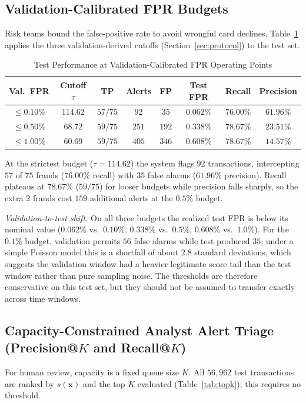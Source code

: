 \documentclass[conference]{IEEEtran}
\begin{document}
\subsection{Validation-Calibrated FPR Budgets}
Risk teams bound the false-positive rate to avoid wrongful card declines. Table~\ref{tab:fpr_budgets} applies the three validation-derived cutoffs (Section~\ref{sec:protocol}) to the test set.

\begin{table}[!t]
\centering
\caption{Test Performance at Validation-Calibrated FPR Operating Points}
\renewcommand{\arraystretch}{1.15}
\small
\begin{tabular}{cccccccc}
\toprule
\textbf{Val.\ FPR} & \textbf{Cutoff $\tau$} & \textbf{TP} & \textbf{Alerts} & \textbf{FP} & \textbf{Test FPR} & \textbf{Recall} & \textbf{Precision} \\
\midrule
$\mathbf{\le 0.10\%}$ & $114.62$ & $57/75$ & $92$ & $35$ & $0.062\%$ & $\mathbf{76.00\%}$ & $\mathbf{61.96\%}$ \\
$\le 0.50\%$ & $68.72$ & $59/75$ & $251$ & $192$ & $0.338\%$ & $78.67\%$ & $23.51\%$ \\
$\le 1.00\%$ & $60.69$ & $59/75$ & $405$ & $346$ & $0.608\%$ & $78.67\%$ & $14.57\%$ \\
\bottomrule
\end{tabular}
\label{tab:fpr_budgets}
\end{table}

At the strictest budget ($\tau = 114.62$) the system flags $92$ transactions, intercepting $57$ of $75$ frauds ($76.00\%$ recall) with $35$ false alarms ($61.96\%$ precision). Recall plateaus at $78.67\%$ ($59/75$) for looser budgets while precision falls sharply, so the extra $2$ frauds cost $159$ additional alerts at the $0.5\%$ budget.

\textit{Validation-to-test shift.} On all three budgets the realized test FPR is below its nominal value ($0.062\%$ vs.\ $0.10\%$, $0.338\%$ vs.\ $0.5\%$, $0.608\%$ vs.\ $1.0\%$). For the $0.1\%$ budget, validation permits $56$ false alarms while test produced $35$; under a simple Poisson model this is a shortfall of about $2.8$ standard deviations, which suggests the validation window had a heavier legitimate score tail than the test window rather than pure sampling noise. The thresholds are therefore conservative on this test set, but they should not be assumed to transfer exactly across time windows.

\subsection{Capacity-Constrained Analyst Alert Triage (\texorpdfstring{Precision@$K$ and Recall@$K$}{Precision@K and Recall@K})}
For human review, capacity is a fixed queue size $K$. All $56{,}962$ test transactions are ranked by $s(\mathbf{x})$ and the top $K$ evaluated (Table~\ref{tab:topk}); this requires no threshold.
\end{document}
